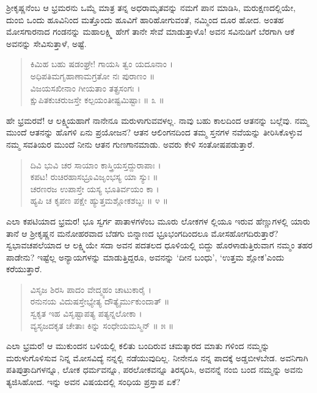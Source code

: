 ಶ್ರೀಕೃಷ್ಣನೆಂಬ ಆ ಭ್ರಮರನು ಒಮ್ಮೆ ಮಾತ್ರ ತನ್ನ ಅಧರಾಮೃತವನ್ನು ನಮಗೆ ಪಾನ ಮಾಡಿಸಿ, ಮರುಕ್ಷಣದಲ್ಲಿಯೇ, ದುಂಬಿ ಒಂದು ಹೂವಿನಿಂದ ಮತ್ತೊಂದು ಹೂವಿಗೆ ಹಾರಿಹೋಗುವಂತೆ, ನಮ್ಮಿಂದ ದೂರ ಹೋದ. ಅಂತಹ ಮೋಸಗಾರನಾದ ಗಂಡನನ್ನು ಮಹಾಲಕ್ಷ್ಮಿ ಹೇಗೆ ತಾನೇ ಸೇವೆ ಮಾಡುತ್ತಾಳೊ! ಅವನ ಸವಿನುಡಿಗೆ ಬೆರಗಾಗಿ ಆಕೆ ಅವನನ್ನು ಸೇವಿಸುತ್ತಾಳೆ, ಅಷ್ಟೆ.

\begin{verse}
ಕಿಮಿಹ ಬಹು ಷಡಂಘ್ರೇ! ಗಾಯಸಿ ತ್ವಂ ಯದೂನಾಂ ।\\ಅಧಿಪತಿಮಗೃಹಾಣಾಮಗ್ರತೋ ನಃ ಪುರಾಣಂ ॥\\ವಿಜಯಸಖೀನಾಂ ಗೀಯತಾಂ ತತ್ಪ್ರಸಂಗಃ ।\\ಕ್ಷುಪಿತಕುಚರುಜಸ್ತೇ ಕಲ್ಪಯಂತೀಷ್ಟಮಿಷ್ಟಾಃ \num{॥ ೩ ॥}
\end{verse}

ಹೇ ಭ್ರಮರವೆ! ಆ ಲಕ್ಷ್ಮಿಯಹಾಗೆ ನಾನೇನೂ ಮರುಳಾಗುವವಳಲ್ಲ. ನಾವು ಬಹು ಕಾಲದಿಂದ ಆತನನ್ನು ಬಲ್ಲೆವು. ನಮ್ಮ ಮುಂದೆ ಆತನನ್ನು ಹೊಗಳಿ ಏನು ಪ್ರಯೋಜನ? ಆತನ ಆಲಿಂಗನದಿಂದ ತಮ್ಮ ಸ್ತನಗಳ ನವೆಯನ್ನು ತೀರಿಸಿಕೊಳ್ಳುವ ನಮ್ಮ ಸವತಿಯರ ಮುಂದೆ ನೀನು ಆತನ ಗುಣಗಾನಮಾಡು. ಅವರು ಕೇಳಿ ಸಂತೋಷಪಡುತ್ತಾರೆ.

\begin{verse}
ದಿವಿ ಭುವಿ ಚರ ಸಾಯಾಂ ಕಾಸ್ತ್ರಿಯಸ್ತದ್ದುರಾಪಾಃ ।\\ಕಪಟ! ರುಚಿರಹಾಸಭ್ರೂವಿಜೃಂಭಸ್ಯ ಯಾ ಸ್ಯುಃ ॥\\ಚರಣರಜ ಉಪಾಸ್ತೇ ಯಸ್ಯ ಭೂತಿರ್ವಯಂ ಕಾ ।\\ಹ್ಯಪಿ ಚ ಕೃಪಣ ಪಕ್ಷೇ ಹ್ಯುತ್ತಮಶ್ಲೋಕಶಬ್ದಃ \num{॥ ೪ ॥}
\end{verse}

ಎಲಾ ಕಪಟಿಯಾದ ಭ್ರಮರ! ಭೂ ಸ್ವರ್ಗ ಪಾತಾಳಗಳೆಂಬ ಮೂರು ಲೋಕಗಳ ಲ್ಲಿಯೂ ಇರುವ ಹೆಣ್ಣುಗಳಲ್ಲಿ ಯಾರು ತಾನೆ ಆ ಶ್ರೀಕೃಷ್ಣನ ಮನೋಹರವಾದ ಬೆಡಗು ಬಿನ್ನಾಣದ ಭ್ರೂಭಂಗದಿಂದಲೂ ಮೋಸಹೋಗದಿರುತ್ತಾರೆ? ಸ್ವಭಾವಚಪಲೆಯಾದ ಆ ಲಕ್ಷ್ಮಿಯೇ ಸದಾ ಅವನ ಪದತಲದ ಧೂಳಿಯಲ್ಲಿ ಬಿದ್ದು ಹೊರಳಾಡುತ್ತಿರುವಾಗ ನಮ್ಮಂ ತಹರ ಪಾಡೇನು? ಇಷ್ಟೆಲ್ಲ ಅನ್ಯಾಯಗಳನ್ನು ಮಾಡುತ್ತಿದ್ದರೂ, ಅವನನ್ನು ‘ದೀನ ಬಂಧು’, ‘ಉತ್ತಮ ಶ್ಲೋಕ’ಎಂದು ಕರೆಯುತ್ತಾರೆ.

\begin{verse}
ವಿಸೃಜ ಶಿರಸಿ ಪಾದಂ ವೇದ್ಮ್ಯಹಂ ಚಾಟುಕಾರೈ ।\\ರನುನಯ ವಿದುಷಸ್ತೇಭ್ಯೇತ್ಯ ದೌತ್ಯೈರ್ಮುಕುಂದಾತ್ ॥\\ಸ್ವಕೃತ ಇಹ ವಿಸೃಷ್ಟಾಪತ್ಯ ಪತ್ಯನ್ನಲೋಕಾ ।\\ವ್ಯಸೃಜದಕೃತ ಚೇತಾಃ ಕಿನ್ನು ಸಂಧೇಯಮಸ್ಮಿನ್ \num{॥ ೫ ॥}
\end{verse}

ಎಲಾ ಭ್ರಮರ! ಆ ಮುಕುಂದನ ಬಳಿಯಲ್ಲಿ ಕಲಿತು ಬಂದಿರುವ ಚಮತ್ಕಾರದ ಮಾತು ಗಳಿಂದ ನಮ್ಮನ್ನು ಮರುಳುಗೊಳಿಸುವ ನಿನ್ನ ಮೋಸವಿದ್ಯೆ ನನ್ನಲ್ಲಿ ನಡೆಯುವುದಿಲ್ಲ. ನೀನೇನೂ ನನ್ನ ಪಾದಕ್ಕೆ ಅಡ್ಡಬೀಳಬೇಡ. ಅವನಿಗಾಗಿ ಪತಿಪುತ್ರಾದಿಗಳನ್ನೂ, ಲೋಕ ಧರ್ಮವನ್ನೂ, ಪರಲೋಕವನ್ನೂ ತಿರಸ್ಕರಿಸಿ, ಅವನನ್ನೆ ನಂಬಿ ಬಂದ ನಮ್ಮನ್ನು ಅವನು ತ್ಯಜಿಸಿಹೋದ. ಇನ್ನು ಅವನ ವಿಷಯದಲ್ಲಿ ಸಂಧಿಯ ಪ್ರಸ್ತಾಪ ಏಕೆ?

